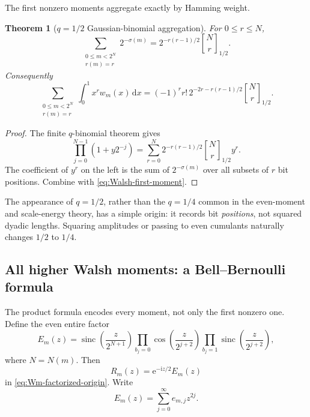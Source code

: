 \documentclass[11pt,oneside]{article}
\newtheorem{theorem}{Theorem}[section]
\theoremstyle{definition}
\theoremstyle{remark}
\newcommand{\sinc}{\operatorname{sinc}}
\newcommand{\e}{\mathrm e}
\newcommand{\ii}{\mathrm i}
\newcommand{\dd}{\,\mathrm d}
\newcommand{\qbinom}[3]{\genfrac{[}{]}{0pt}{}{#1}{#2}_{#3}}
\begin{document}
The first nonzero moments aggregate exactly by Hamming weight.

\begin{theorem}[$q=1/2$ Gaussian-binomial aggregation]
\label{thm:qbinom-Walsh}
For $0\le r\le N$,
\begin{equation}\label{eq:sigma-qbinom}
 \sum_{\substack{0\le m<2^N\\r(m)=r}}2^{-\sigma(m)}
 =2^{-r(r-1)/2}\qbinom{N}{r}{1/2}.
\end{equation}
Consequently
\begin{equation}\label{eq:first-moment-qbinom}
 \sum_{\substack{0\le m<2^N\\r(m)=r}}
 \int_0^1x^rw_m(x)\dd x
 =(-1)^rr!\,2^{-2r-r(r-1)/2}\qbinom{N}{r}{1/2}.
\end{equation}
\end{theorem}

\begin{proof}
The finite $q$-binomial theorem gives
\[
 \prod_{j=0}^{N-1}(1+y2^{-j})
 =\sum_{r=0}^N2^{-r(r-1)/2}\qbinom{N}{r}{1/2}y^r.
\]
The coefficient of $y^r$ on the left is the sum of $2^{-\sigma(m)}$ over
all subsets of $r$ bit positions.  Combine with
\eqref{eq:Walsh-first-moment}.
\end{proof}

The appearance of $q=1/2$, rather than the $q=1/4$ common in the even-moment
and scale-energy theory, has a simple origin: it records bit \emph{positions},
not squared dyadic lengths.  Squaring amplitudes or passing to even cumulants
naturally changes $1/2$ to $1/4$.

\subsection{All higher Walsh moments: a Bell--Bernoulli formula}

The product formula encodes every moment, not only the first nonzero one.
Define the even entire factor
\begin{equation}\label{eq:Em-def}
 E_m(z)=
 \sinc\!\left(\frac{z}{2^{N+1}}\right)
 \prod_{b_j=0}\cos\!\left(\frac{z}{2^{j+2}}\right)
 \prod_{b_j=1}\sinc\!\left(\frac{z}{2^{j+2}}\right),
\end{equation}
where $N=N(m)$.  Then
\begin{equation}\label{eq:R-m-E}
 R_m(z)=\e^{-\ii z/2}E_m(z)
\end{equation}
in \eqref{eq:Wm-factorized-origin}.  Write
\begin{equation}\label{eq:E-coefficients}
 E_m(z)=\sum_{j=0}^\infty e_{m,j}z^{2j}.
\end{equation}
\end{document}
